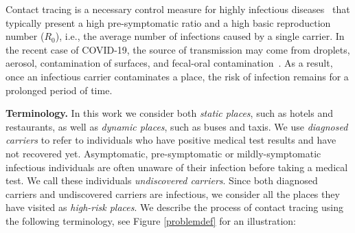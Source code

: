     Contact tracing is a necessary control measure for highly infectious diseases~\cite{Fraser2004} that typically present a high pre-symptomatic ratio and a high basic reproduction number ($R_0$), i.e., the average number of infections caused by a single carrier. In the recent case of COVID-19, the source of transmission may come from droplets, aerosol, contamination of surfaces, and fecal-oral contamination~\cite{Ferretti2020}. As a result, once an infectious carrier contaminates a place, the risk of infection remains for a prolonged period of time.  


\textbf{Terminology.} In this work we consider both \emph{static places}, such as hotels and restaurants, as well as \emph{dynamic places}, such as buses and taxis. 
We use \emph{diagnosed carriers} to refer to individuals who have positive medical test results and have not recovered yet. 
Asymptomatic, pre-symptomatic or mildly-symptomatic infectious individuals are often unaware of their infection before taking a medical test. We call these individuals \emph{undiscovered carriers}. Since both diagnosed carriers and undiscovered carriers are infectious, we consider all the places they have visited as \emph{high-risk places}. %
We describe the process of contact tracing  using the following terminology, see
Figure \ref{problemdef} for an illustration:

